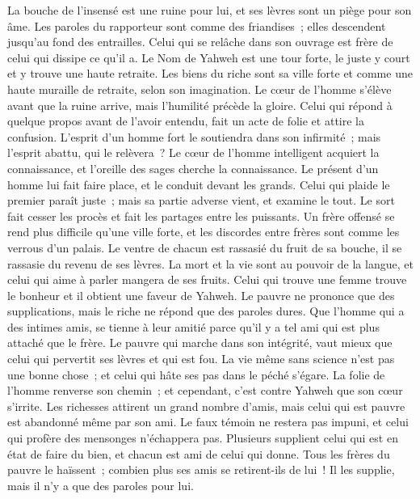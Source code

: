 \begin{multicols}{2}
La bouche de l'insensé est une ruine pour lui, et ses lèvres sont un piège pour son âme.
Les paroles du rapporteur sont comme des friandises~; elles descendent jusqu'au fond des entrailles.
Celui qui se relâche dans son ouvrage est frère de celui qui dissipe ce qu'il a.
Le Nom de Yahweh est une tour forte, le juste y court et y trouve une haute retraite.
Les biens du riche sont sa ville forte et comme une haute muraille de retraite, selon son imagination.
Le cœur de l'homme s'élève avant que la ruine arrive, mais l'humilité précède la gloire.
Celui qui répond à quelque propos avant de l'avoir entendu, fait un acte de folie et attire la confusion.
L'esprit d'un homme fort le soutiendra dans son infirmité~; mais l'esprit abattu, qui le relèvera~?
Le cœur de l'homme intelligent acquiert la connaissance, et l'oreille des sages cherche la connaissance.
Le présent d'un homme lui fait faire place, et le conduit devant les grands.
Celui qui plaide le premier paraît juste~; mais sa partie adverse vient, et examine le tout.
Le sort fait cesser les procès et fait les partages entre les puissants.
Un frère offensé se rend plus difficile qu'une ville forte, et les discordes entre frères sont comme les verrous d'un palais.
Le ventre de chacun est rassasié du fruit de sa bouche, il se rassasie du revenu de ses lèvres.
La mort et la vie sont au pouvoir de la langue, et celui qui aime à parler mangera de ses fruits.
Celui qui trouve une femme trouve le bonheur et il obtient une faveur de Yahweh.
Le pauvre ne prononce que des supplications, mais le riche ne répond que des paroles dures.
Que l'homme qui a des intimes amis, se tienne à leur amitié parce qu'il y a tel ami qui est plus attaché que le frère.
\VerseOne{}Le pauvre qui marche dans son intégrité, vaut mieux que celui qui pervertit ses lèvres et qui est fou.
La vie même sans science n'est pas une bonne chose~; et celui qui hâte ses pas dans le péché s'égare.
La folie de l'homme renverse son chemin~; et cependant, c'est contre Yahweh que son cœur s'irrite.
Les richesses attirent un grand nombre d'amis, mais celui qui est pauvre est abandonné même par son ami.
Le faux témoin ne restera pas impuni, et celui qui profère des mensonges n'échappera pas.
Plusieurs supplient celui qui est en état de faire du bien, et chacun est ami de celui qui donne.
Tous les frères du pauvre le haïssent~; combien plus ses amis se retirent-ils de lui~! Il les supplie, mais il n'y a que des paroles pour lui.

\end{multicols}
